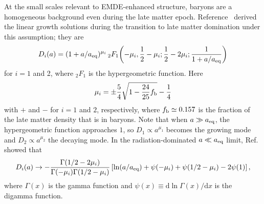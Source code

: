 \documentclass[a4paper,11pt]{article}
\newcommand{\aeq}{a_{\rm eq}}
\newcommand{\fb}{f_{\rm b}}
\newcommand{\diff}{\ensuremath{\mathrm{d}}}
\begin{document}
At the small scales relevant to EMDE-enhanced structure, baryons are a homogeneous background even during the late matter epoch. Reference~\cite{hu96} derived the linear growth solutions during the transition to late matter domination under this assumption; they are
\begin{equation}\label{growth_solutions}
D_i(a)=(1+a/\aeq)^{\mu_i}
\,_2F_1\!\left(-\mu_i,\frac{1}{2}-\mu_i;\frac{1}{2}-2\mu_i;\frac{1}{1+a/\aeq}\right)
\end{equation}
for $i=1$ and 2, where $_2F_1$ is the hypergeometric function. Here
\begin{equation}
\mu_i=\pm\frac{5}{4}\sqrt{1-\frac{24}{25}\fb}-\frac{1}{4}
\end{equation}
with $+$ and $-$ for $i=1$ and $2$, respectively, where $\fb\simeq 0.157$ is the fraction of the late matter density that is in baryons. Note that when $a\gg\aeq$, the hypergeometric function approaches $1$, so $D_1\propto a^{\mu_1}$ becomes the growing mode and $D_2\propto a^{\mu_2}$ the decaying mode. In the radiation-dominated $a\ll\aeq$ limit, Ref.~\cite{hu96} showed that
\begin{equation}
D_i(a) \to
-\frac{\Gamma(1/2-2\mu_i)}{\Gamma(-\mu_i)\Gamma(1/2-\mu_i)}
\left[
\ln (a/\aeq)+\psi(-\mu_i)+\psi(1/2-\mu_i)-2\psi(1)
\right],
\end{equation}
where $\Gamma(x)$ is the gamma function and $\psi(x)\equiv\diff\ln\Gamma(x)/\diff x$ is the digamma function.
\end{document}
